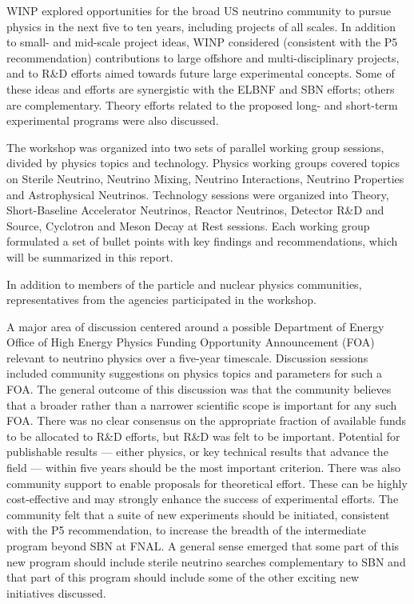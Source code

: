 WINP explored opportunities for the broad US neutrino community to pursue
physics in the next five to ten years, including projects of all
scales.  In addition to small- and mid-scale project ideas, WINP
considered (consistent with the P5 recommendation) contributions to
large offshore and multi-disciplinary projects, and to R\&D efforts
aimed towards future large experimental concepts.  Some of these ideas
and efforts are synergistic with the ELBNF and SBN efforts; others are
complementary.  Theory efforts related to the proposed long- and
short-term experimental programs were also discussed.

The workshop was organized into two sets of parallel working group
sessions, divided by physics topics and technology.  Physics working
groups covered topics on Sterile Neutrino, Neutrino Mixing, Neutrino
Interactions, Neutrino Properties and Astrophysical Neutrinos.
Technology sessions were organized into Theory, Short-Baseline
Accelerator Neutrinos, Reactor Neutrinos, Detector R\&D and Source,
Cyclotron and Meson Decay at Rest sessions.  Each working group
formulated a set of bullet points with key findings and
recommendations, which will be summarized in this report.


In addition to members of the particle and nuclear physics
communities, representatives from the agencies participated in the workshop.

A major area of discussion centered around a possible Department of
Energy Office of High Energy Physics Funding Opportunity Announcement
(FOA) relevant to neutrino physics over a five-year timescale.
Discussion sessions included community suggestions on physics topics
and parameters for such a FOA.  The general outcome of this discussion
was that the community believes that a broader rather than a narrower
scientific scope is important for any such FOA.  There was no clear
consensus on the appropriate fraction of available funds to be
allocated to R\&D efforts, but R\&D was felt to be important.
Potential for publishable results --- either physics, or key technical
results that advance the field --- within five years should be the
most important criterion.  There was also community support to enable
proposals for theoretical effort.  These can be highly cost-effective
and may strongly enhance the success of experimental efforts.
The community felt that a suite of new experiments should be
initiated, consistent with the P5 recommendation, to increase the
breadth of the intermediate program beyond SBN at FNAL. A general
sense emerged that some part of this new program should include
sterile neutrino searches complementary to SBN and that part of this
program should include some of the other exciting new initiatives
discussed.

